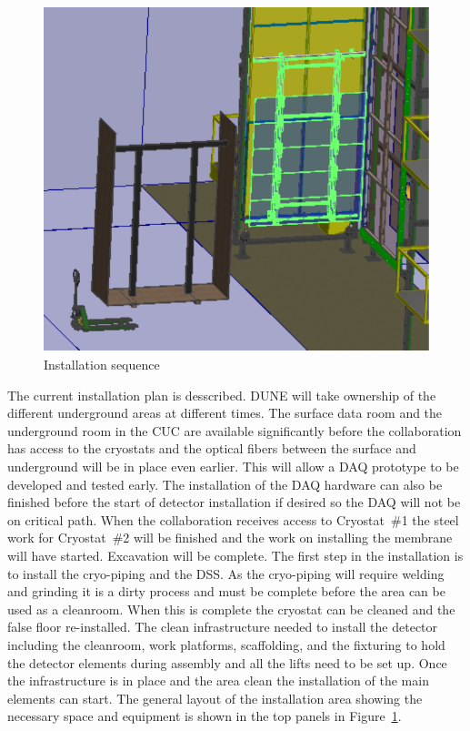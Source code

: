 \begin{figure}[htbp]
\begin{center}
\begin{minipage}[c]{0.32\textwidth}
\end{minipage}
\begin{minipage}[c]{0.32\textwidth}
\includegraphics[width=\textwidth]{far-detector-single-phase/figures/CPA-3.pdf}
\end{minipage}

\caption{Installation sequence}
\label{Install-Seq}
\end{center}
\end{figure}

The current installation plan is desscribed. DUNE will take
ownership of the different underground areas at different times. The
surface data room and the underground room in the CUC are available
significantly before the collaboration has access to the cryostats and
the optical fibers between the surface and underground will be in
place even earlier. This will allow a DAQ prototype to be developed
and tested early. The installation of the DAQ hardware can also be
finished before the start of detector installation if desired so the
DAQ will not be on critical path.  When the collaboration receives
access to Cryostat~\#1 the steel work for Cryostat~\#2 will be
finished and the work on installing the membrane will have
started. Excavation will be complete.  The first step in the
installation is to install the cryo-piping and the DSS. As the
cryo-piping will require welding and grinding it is a dirty process
and must be complete before the area can be used as a cleanroom. When
this is complete the cryostat can be cleaned and the false floor
re-installed. The clean infrastructure needed to install the detector
including the cleanroom, work platforms, scaffolding, and the
fixturing to hold the detector elements during assembly and all the
lifts need to be set up. Once the infrastructure is in place and the area
clean the installation of the main elements can start. The general
layout of the installation area showing the necessary space and
equipment is shown in the top panels in Figure~\ref{Install-Seq}.

